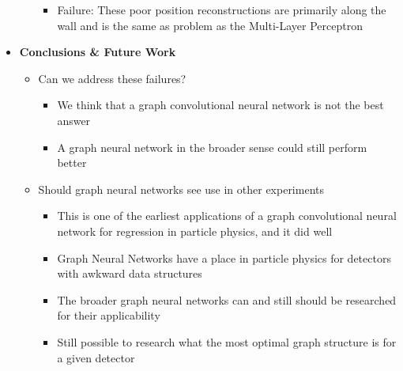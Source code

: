 \documentclass[12pt]{article}
\begin{document}
\begin{itemize}
\begin{itemize}
\begin{itemize}
						\item Failure: These poor position reconstructions are primarily along the wall and is the same as problem as the Multi-Layer Perceptron
					\end{itemize}
			\end{itemize}
		\item \textbf{Conclusions \& Future Work}
			\begin{itemize}
				\item Can we address these failures?
					\begin{itemize}
						\item We think that a graph convolutional neural network is not the best answer
						\item A graph neural network in the broader sense could still perform better
					\end{itemize}
				\item Should graph neural networks see use in other experiments
					\begin{itemize}
						\item This is one of the earliest applications of a graph convolutional neural network for regression in particle physics, and it did well
						\item Graph Neural Networks have a place in particle physics for detectors with awkward data structures
						\item The broader graph neural networks can and still should be researched for their applicability
						\item Still possible to research what the most optimal graph structure is for a given detector
					\end{itemize}
			\end{itemize}
	\end{itemize}
\end{document}
